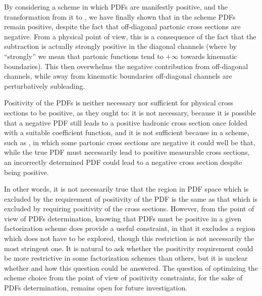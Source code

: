 By considering a scheme in which PDFs are manifestly positive, and the
transformation from it to \msbar{}, we have finally shown that in the
\msbar{} scheme PDFs remain positive, despite the fact that off-diagonal partonic
cross sections are negative. From a physical point of view, this is a consequence
of the fact that the \msbar{} subtraction is actually strongly positive
in the diagonal channels (where by ``strongly'' we mean that
partonic  functions tend to $+\infty$  towards kinematic
boundaries). This then overwhelms the negative contribution from
off-diagonal channels, while away from kinematic boundaries
off-diagonal channels are perturbatively subleading.

Positivity of the PDFs is neither necessary nor sufficient for physical
cross sections to be positive, as they ought to: it is not necessary,
because it is possible that a negative PDF still leads to a positive
hadronic cross section once folded with a suitable coefficient
function, and it is not sufficient because in a scheme, such as
\msbar{},
in which some partonic cross sections are negative it could well be
that, while the true PDF must necessarily lead to positive measurable
cross sections,  an incorrectly determined PDF could lead to a negative
cross section despite being positive.

In other words, it is not necessarily true that 
the region in PDF space which is excluded by the requirement of
positivity of the PDF is the same as that which is excluded by
requiring positivity of the cross sections. However, from the point of
view of PDFs determination, knowing that PDFs must be
positive in a given factorization scheme does provide a useful constraint,
in that it excludes a region which does not have to be explored,
though this restriction is not necessarily the most stringent one. It
is natural to ask whether the positivity requirement could be
more restrictive in some factorization schemes than others, but it is
unclear whether and how this question could be answered. The question
of optimizing the scheme choice from the point of view of positivity
constraints, for the sake of PDFs determination, remains open for
future investigation.

